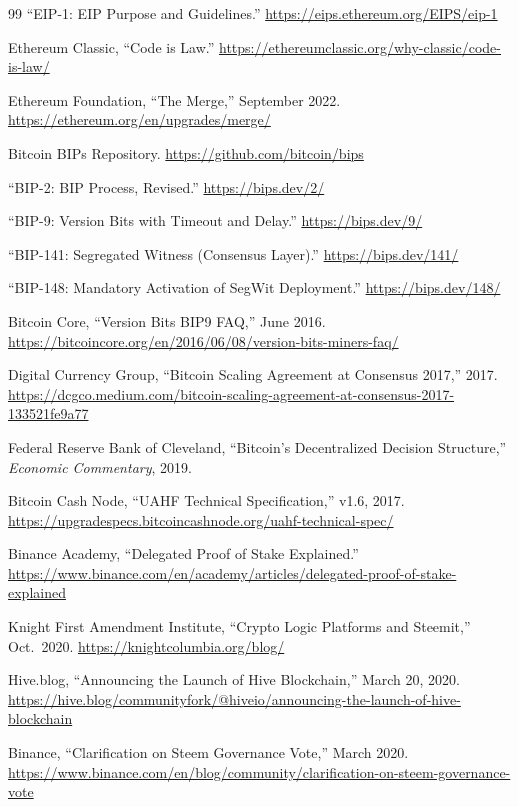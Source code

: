 \documentclass[sigconf,nonacm]{acmart}
\begin{document}
{\begin{thebibliography}{99}
``EIP-1: EIP Purpose and Guidelines.''
\url{https://eips.ethereum.org/EIPS/eip-1}

Ethereum Classic, ``Code is Law.''
\url{https://ethereumclassic.org/why-classic/code-is-law/}

Ethereum Foundation, ``The Merge,'' September 2022.
\url{https://ethereum.org/en/upgrades/merge/}

Bitcoin BIPs Repository. \url{https://github.com/bitcoin/bips}

``BIP-2: BIP Process, Revised.'' \url{https://bips.dev/2/}

``BIP-9: Version Bits with Timeout and Delay.'' \url{https://bips.dev/9/}

``BIP-141: Segregated Witness (Consensus Layer).'' \url{https://bips.dev/141/}

``BIP-148: Mandatory Activation of SegWit Deployment.'' \url{https://bips.dev/148/}

Bitcoin Core, ``Version Bits BIP9 FAQ,'' June 2016.
\url{https://bitcoincore.org/en/2016/06/08/version-bits-miners-faq/}

Digital Currency Group, ``Bitcoin Scaling Agreement at Consensus 2017,'' 2017.
\url{https://dcgco.medium.com/bitcoin-scaling-agreement-at-consensus-2017-133521fe9a77}

Federal Reserve Bank of Cleveland, ``Bitcoin's Decentralized Decision Structure,''
\emph{Economic Commentary}, 2019.

Bitcoin Cash Node, ``UAHF Technical Specification,'' v1.6, 2017.
\url{https://upgradespecs.bitcoincashnode.org/uahf-technical-spec/}

Binance Academy, ``Delegated Proof of Stake Explained.''
\url{https://www.binance.com/en/academy/articles/delegated-proof-of-stake-explained}

Knight First Amendment Institute, ``Crypto Logic Platforms and Steemit,'' Oct.\ 2020.
\url{https://knightcolumbia.org/blog/}

Hive.blog, ``Announcing the Launch of Hive Blockchain,'' March 20, 2020.
\url{https://hive.blog/communityfork/@hiveio/announcing-the-launch-of-hive-blockchain}

Binance, ``Clarification on Steem Governance Vote,'' March 2020.
\url{https://www.binance.com/en/blog/community/clarification-on-steem-governance-vote}


\end{thebibliography}}
\end{document}
